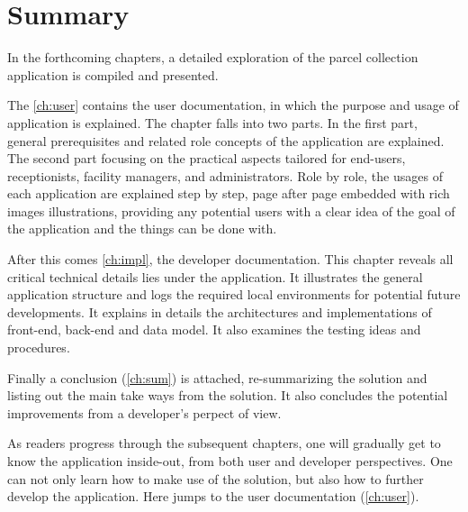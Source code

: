 \section{Summary}
\label{sec:IntroSum}

In the forthcoming chapters, a detailed exploration of the parcel collection application is compiled and presented. 

The \autoref{ch:user} contains the user documentation, in which the purpose and usage of application is explained. The chapter falls into two parts. In the first part, general prerequisites and related role concepts of the application are explained. The second part focusing on the practical aspects tailored for end-users, receptionists, facility managers, and administrators. Role by role, the usages of each application are explained step by step, page after page embedded with rich images illustrations, providing any potential users with a clear idea of the goal of the application and the things can be done with. 

After this comes \autoref{ch:impl}, the developer documentation. This chapter reveals all critical technical details lies under the application. It illustrates the general application structure and logs the required local environments for potential future developments. It explains in details the architectures and implementations of front-end, back-end and data model. It also examines the testing ideas and procedures. 

Finally a conclusion (\autoref{ch:sum}) is attached, re-summarizing the solution and listing out the main take ways from the solution. It also concludes the potential improvements from a developer's perpect of view.

As readers progress through the subsequent chapters, one will gradually get to know the application inside-out, from both user and developer perspectives. One can not only learn how to make use of the solution, but also how to further develop the application.
Here jumps to the user documentation (\autoref{ch:user}).



